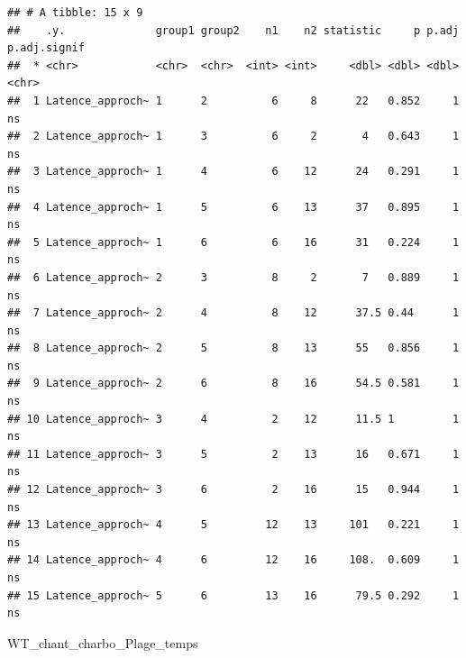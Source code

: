 \documentclass[
  french,
]{article}
\newenvironment{Shaded}{\begin{snugshade}}{\end{snugshade}}
\newcommand{\NormalTok}[1]{#1}
\begin{document}
\begin{verbatim}
## # A tibble: 15 x 9
##    .y.              group1 group2    n1    n2 statistic     p p.adj p.adj.signif
##  * <chr>            <chr>  <chr>  <int> <int>     <dbl> <dbl> <dbl> <chr>       
##  1 Latence_approch~ 1      2          6     8      22   0.852     1 ns          
##  2 Latence_approch~ 1      3          6     2       4   0.643     1 ns          
##  3 Latence_approch~ 1      4          6    12      24   0.291     1 ns          
##  4 Latence_approch~ 1      5          6    13      37   0.895     1 ns          
##  5 Latence_approch~ 1      6          6    16      31   0.224     1 ns          
##  6 Latence_approch~ 2      3          8     2       7   0.889     1 ns          
##  7 Latence_approch~ 2      4          8    12      37.5 0.44      1 ns          
##  8 Latence_approch~ 2      5          8    13      55   0.856     1 ns          
##  9 Latence_approch~ 2      6          8    16      54.5 0.581     1 ns          
## 10 Latence_approch~ 3      4          2    12      11.5 1         1 ns          
## 11 Latence_approch~ 3      5          2    13      16   0.671     1 ns          
## 12 Latence_approch~ 3      6          2    16      15   0.944     1 ns          
## 13 Latence_approch~ 4      5         12    13     101   0.221     1 ns          
## 14 Latence_approch~ 4      6         12    16     108.  0.609     1 ns          
## 15 Latence_approch~ 5      6         13    16      79.5 0.292     1 ns
\end{verbatim}

\begin{Shaded}
\begin{Highlighting}[]
\NormalTok{WT\_chant\_charbo\_Plage\_temps}
\end{Highlighting}
\end{Shaded}
\end{document}
